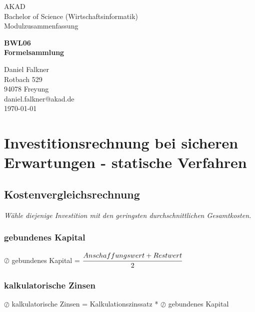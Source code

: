 \documentclass[a4paper,12pt]{scrartcl}
\begin{document}
\begin{titlepage}
\begin{small}
\vfill {AKAD\\ 
Bachelor of Science (Wirtschaftsinformatik) \\ 
Modulzusammenfassung}
\end{small}


\begin{center}
\begin{Large}
\vfill {\textsf{\textbf{
BWL06 \\
\vspace*{1cm} 
Formelsammlung
}}}
\end{Large}
\end{center}

\begin{small}
\vfill Daniel Falkner \\ Rotbach 529 \\  94078 Freyung \\  daniel.falkner@akad.de \\ 
\today
\end{small}

\end{titlepage}


\tableofcontents

\clearpage

\onehalfspacing

\pagestyle{plain}



\section{Investitionsrechnung bei sicheren Erwartungen - statische Verfahren}
\subsection{Kostenvergleichsrechnung}
\textit{Wähle diejenige Investition mit den geringsten durchschnittlichen Gesamtkosten.}
\subsubsection{gebundenes Kapital}
$\oslash$ gebundenes Kapital = $\cfrac{Anschaffungswert + Restwert}{2}$
\subsubsection{kalkulatorische Zinsen}
$\oslash$ kalkulatorische Zinsen = Kalkulationszinssatz * $\oslash$ gebundenes Kapital
\end{document}
